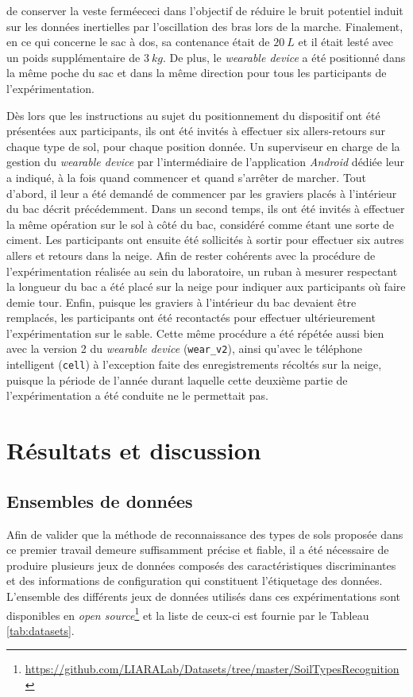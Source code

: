 \noindent de conserver la veste fermée\textemdash ceci dans l'objectif de réduire le bruit potentiel induit sur les données inertielles par l'oscillation des bras lors de la marche. Finalement, en ce qui concerne le sac à dos, sa contenance était de $20\:L$ et il était lesté avec un poids supplémentaire de $3\:kg$. De plus, le \textit{wearable device} a été positionné dans la même poche du sac et dans la même direction pour tous les participants de l'expérimentation.

Dès lors que les instructions au sujet du positionnement du dispositif ont été présentées aux participants, ils ont été invités à effectuer six allers-retours sur chaque type de sol, pour chaque position donnée. Un superviseur en charge de la gestion du \textit{wearable device} par l'intermédiaire de l’application \textit{Android} dédiée leur a indiqué, à la fois quand commencer et quand s’arrêter de marcher. Tout d'abord, il leur a été demandé de commencer par les graviers placés à l'intérieur du bac décrit précédemment. Dans un second temps, ils ont été invités à effectuer la même opération sur le sol à côté du bac, considéré comme étant une sorte de ciment. Les participants ont ensuite été sollicités à sortir pour effectuer six autres allers et retours dans la neige. Afin de rester cohérents avec la procédure de l'expérimentation réalisée au sein du laboratoire, un ruban à mesurer respectant la longueur du bac a été placé sur la neige pour indiquer aux participants où faire demie tour. Enfin, puisque les graviers à l'intérieur du bac devaient être remplacés, les participants ont été recontactés pour effectuer ultérieurement l'expérimentation sur le sable. Cette même procédure a été répétée aussi bien avec la version 2 du \textit{wearable device} (\texttt{wear\_v2}), ainsi qu'avec le téléphone intelligent (\texttt{cell}) à l'exception faite des enregistrements récoltés sur la neige, puisque la période de l'année durant laquelle cette deuxième partie de l'expérimentation a été conduite ne le permettait pas.

\section{Résultats et discussion}

\subsection{Ensembles de données}

Afin de valider que la méthode de reconnaissance des types de sols proposée dans ce premier travail demeure suffisamment précise et fiable, il a été nécessaire de produire plusieurs jeux de données composés des caractéristiques discriminantes et des informations de configuration qui constituent l'étiquetage des données. L'ensemble des différents jeux de données utilisés dans ces expérimentations sont disponibles en \textit{open source}\footnote{\url{https://github.com/LIARALab/Datasets/tree/master/SoilTypesRecognition}} et la liste de ceux-ci est fournie par le Tableau \ref{tab:datasets}.

